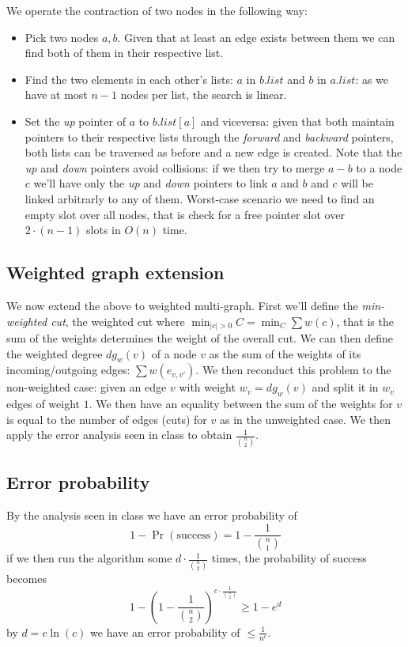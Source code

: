 We operate the contraction of two nodes in the following way:
\begin{itemize}
\item Pick two nodes $a, b$.
Given that at least an edge exists between them we can find both of them in their
respective list.
\item Find the two elements in each other's lists: $a$ in $b.list$ and $b$ in $a.list$:
as we have at most $n - 1$ nodes per list, the search is linear.
\item Set the \emph{up} pointer of $a$ to $b.list[a]$ and viceversa: given that
both maintain pointers to their respective lists through the \emph{forward} and
\emph{backward} pointers, both lists can be traversed as before and a new edge
is created.
Note that the \emph{up} and \emph{down} pointers avoid collisions: if we then try
to merge $a-b$ to a node $c$ we'll have only the \emph{up} and \emph{down} pointers
to link $a$ and $b$ and $c$ will be linked arbitrarly to any of them.
Worst-case scenario we need to find an empty slot over all nodes, that is check
for a free pointer slot over $2 \cdot (n - 1)$ slots in $O(n)$ time.
\end{itemize}

\subsection{Weighted graph extension}

We now extend the above to weighted multi-graph.
First we'll define the \emph{min-weighted cut}, the weighted cut where
$\min_{|c| > 0} C = \min_{C} \sum{w(c)}$, that is the sum of the
weights determines the weight of the overall cut.
We can then define the weighted degree $dg_{w}(v)$ of a node $v$ as the
sum of the weights of its incoming/outgoing edges: $\sum{w(e_{v, v'})}$.
We then reconduct this problem to the non-weighted case: given an edge $v$ with weight $w_v = dg_{w}(v)$ and split it in $w_v$ edges of weight $1$.
We then have an equality between the sum of the weights for $v$ is equal to the number of edges (cuts) for $v$ as in the unweighted case.
We then apply the error analysis seen in class to obtain $\frac{1}{{{n} \choose {2}}}$.

\subsection{Error probability}

By the analysis seen in class we have an error probability of
\begin{equation*}
1 - \Pr({\text{success}}) = 1 - \frac{1}{{{n} \choose {1}}}
\end{equation*}
if we then run the algorithm some $d \cdot \frac{1}{{{n} \choose {2}}}$ times, the probability of success becomes
\begin{equation*}
1 - \left(1 - \frac{1}{{{n} \choose {2}}} \right)^{c \cdot \frac{1}{{{n} \choose {2}}}} \geq 1 - e^{d}
\end{equation*}
by $d = c \ln(c)$ we have an error probability of $\leq \frac{1}{n^c}$.